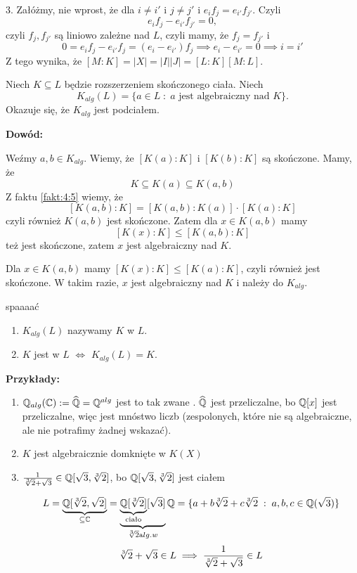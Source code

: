 3. Załóżmy, nie wprost, że dla $i\neq i'$ i $j\neq j'$ i $e_if_j=e_{i'}f_{j'}$. Czyli
$$e_if_j-e_{i'}f_{j'}=0,$$
czyli $f_j,f_{j'}$ są liniowo zależne nad $L$, czyli mamy, że $f_j=f_{j'}$ i
$$0=e_if_j-e_{i'}f_{j}=(e_i-e_{i'})f_j\implies e_i-e_{i'}=0\implies i=i'$$
Z tego wynika, że $[M:K]=|X|=|I||J|=[L:K][M:L]$.

\begin{wniosek}
    Niech $K\subseteq L$ będzie rozszerzeniem skończonego ciała. Niech 
    $$K_{alg}(L)=\{a\in L\;:\;a\text{ jest algebraiczny nad }K\}.$$
    Okazuje się, że $K_{alg}$ jest podciałem.
\end{wniosek}

\textbf{Dowód:}

Weźmy $a,b\in K_{alg}$. Wiemy, że $[K(a):K]$ i $[K(b):K]$ są skończone. Mamy, że
$$K\subseteq K(a)\subseteq K(a, b)$$
Z faktu \ref{fakt:4:5} wiemy, że 
$$[K(a, b):K]=[K(a,b):K(a)]\cdot[K(a):K]$$
czyli również $K(a,b)$ jest skończone. Zatem dla $x\in K(a,b)$ mamy
$$[K(x):K]\leq[K(a,b):K]$$
też jest skończone, zatem $x$ jest algebraiczny nad $K$.
\medskip

Dla $x\in K(a, b)$ mamy $[K(x):K]\leq[K(a):K]$, czyli również jest skończone. W takim razie, $x$ jest algebraiczny nad $K$ i należy do $K_{alg}$.
\medskip

\begin{definicja}{\color{back}spaaaać}
    \begin{enumerate}
        \item $K_{alg}(L)$ nazywamy  $K$ w $L$.
        \item $K$ jest  w $L$ $\iff$ $K_{alg}(L)=K$.
    \end{enumerate}
\end{definicja}

\textbf{Przykłady:} 
\begin{enumerate}
    \item $\mathbb{Q}_{alg}(\mathbb{C}):=\widehat{\mathbb{Q}}=\mathbb{Q}^{alg}$ jest to tak zwane . $\widehat{\mathbb{Q}}$ jest przeliczalne, bo $\mathbb{Q}[x]$ jest przeliczalne, więc jest mnóstwo liczb  (zespolonych, które nie są algebraiczne, ale nie potrafimy żadnej wskazać).
    \item $K$ jest algebraicznie domknięte w $K(X)$
    \item ${1\over\sqrt[3]{2}+\sqrt{3}}\in\mathbb{Q}[\sqrt{3},\sqrt[3]{2}]$, bo $\mathbb{Q}[\sqrt{3},\sqrt[3]{2}]$ jest ciałem
    
    $$L=\underbrace{\mathbb{Q}[\sqrt[3]{2},\sqrt{2}]}_{\subseteq \mathbb{C}}=\underbrace{\underbrace{\mathbb{Q}[\sqrt[3]{2}]}_{\text{ciało}}[\sqrt3]}_{\sqrt[3]{2}\text alg. w }\mathbb{Q}=\{a+b\sqrt[3]{2}+c\sqrt[3]{2}\;:\;a,b,c\in\mathbb{Q}(\sqrt{3})\}$$
    $$\sqrt[3]{2}+\sqrt3\in L\implies{1\over\sqrt[3]{2}+\sqrt{3}}\in L$$
\end{enumerate}